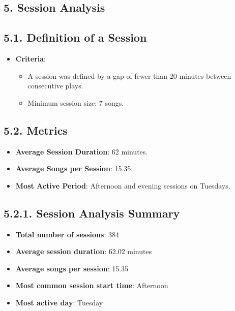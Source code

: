 \documentclass[12pt]{article}
\begin{document}
\begin{itemize}
\section*{5. Session Analysis}

\subsection*{5.1. Definition of a Session}
\begin{itemize}
    \item \textbf{Criteria}:
    \begin{itemize}
        \item A session was defined by a gap of fewer than 20 minutes between consecutive plays.
        \item Minimum session size: 7 songs.
    \end{itemize}
\end{itemize}

\subsection*{5.2. Metrics}
\begin{itemize}
    \item \textbf{Average Session Duration}: 62 minutes.
    \item \textbf{Average Songs per Session}: 15.35.
    \item \textbf{Most Active Period}: Afternoon and evening sessions on Tuesdays.
\end{itemize}

\subsection*{5.2.1. Session Analysis Summary}
\begin{itemize}
    \item \textbf{Total number of sessions}: 384
    \item \textbf{Average session duration}: 62.02 minutes
    \item \textbf{Average songs per session}: 15.35
    \item \textbf{Most common session start time}: Afternoon
    \item \textbf{Most active day}: Tuesday
\end{itemize}


\end{itemize}
\end{document}
